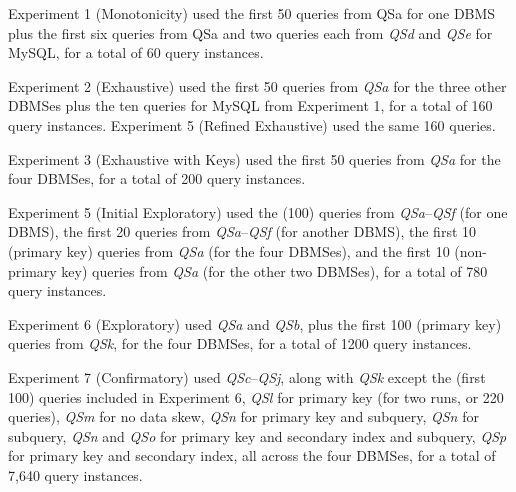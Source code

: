\documentclass[prodmode,acmtods]{acmsmall}
\begin{document}
Experiment 1 (Monotonicity) used the first 50 queries from QSa
for one DBMS plus the first six queries from QSa and two queries each from
{\em QSd} and {\em QSe} for MySQL, for a total of 60 query instances.

Experiment 2 (Exhaustive) used the first 50 queries from {\em QSa}
for the three other DBMSes plus the ten queries for MySQL from Experiment 1, for
a total of 160 query instances. Experiment 5 (Refined Exhaustive) used the same 160 queries.

Experiment 3 (Exhaustive with Keys) used the first 50 queries from {\em QSa}
for the four DBMSes, for a total of 200 query instances.

Experiment 5 (Initial Exploratory) used the (100) queries from {\em
  QSa}--{\em QSf} (for
one DBMS), the first 20 queries from {\em QSa}--{\em QSf} (for another DBMS), the first
10 (primary key) queries from {\em QSa} (for the four DBMSes), and the first 10
(non-primary key) queries from {\em QSa} (for the other two DBMSes), for a total of 780 query instances.

Experiment 6 (Exploratory) used {\em QSa} and {\em QSb}, plus the first 100 (primary
key) queries from {\em QSk}, for the four DBMSes, for a total of 1200 query
instances.

Experiment 7 (Confirmatory) used {\em QSc}--{\em QSj},
along with {\em QSk} except the (first 100) queries included in Experiment 6,
{\em QSl} for primary key (for two runs, or 220 queries),
{\em QSm} for no data skew,
{\em QSn} for primary key and subquery,
{\em QSn} for subquery,
{\em QSn} and {\em QSo} for primary key and secondary index and subquery,
{\em QSp} for primary key and secondary index,
all across the four DBMSes, for a total of 7,640 query instances.

\end{document}
